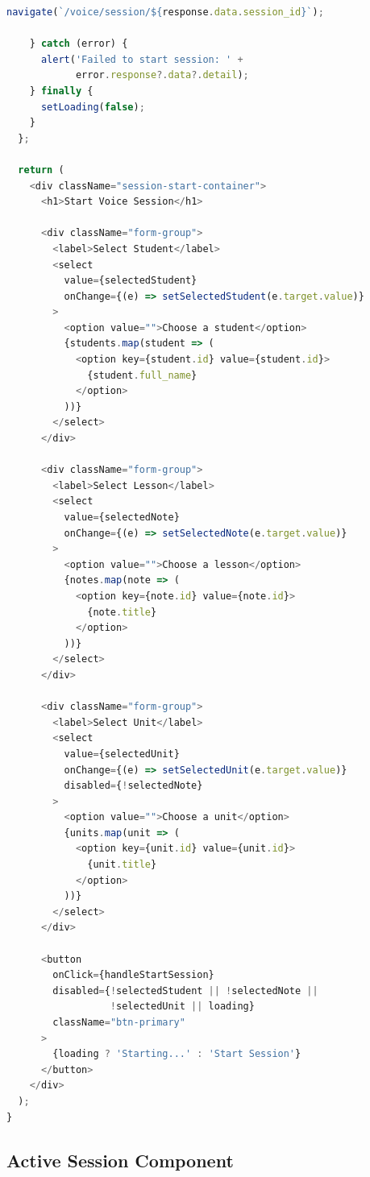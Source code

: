 \documentclass[12pt,a4paper,oneside]{article}
\begin{document}
\begin{lstlisting}[language=javascript]
      navigate(`/voice/session/${response.data.session_id}`);

    } catch (error) {
      alert('Failed to start session: ' + 
            error.response?.data?.detail);
    } finally {
      setLoading(false);
    }
  };

  return (
    <div className="session-start-container">
      <h1>Start Voice Session</h1>
      
      <div className="form-group">
        <label>Select Student</label>
        <select
          value={selectedStudent}
          onChange={(e) => setSelectedStudent(e.target.value)}
        >
          <option value="">Choose a student</option>
          {students.map(student => (
            <option key={student.id} value={student.id}>
              {student.full_name}
            </option>
          ))}
        </select>
      </div>

      <div className="form-group">
        <label>Select Lesson</label>
        <select
          value={selectedNote}
          onChange={(e) => setSelectedNote(e.target.value)}
        >
          <option value="">Choose a lesson</option>
          {notes.map(note => (
            <option key={note.id} value={note.id}>
              {note.title}
            </option>
          ))}
        </select>
      </div>

      <div className="form-group">
        <label>Select Unit</label>
        <select
          value={selectedUnit}
          onChange={(e) => setSelectedUnit(e.target.value)}
          disabled={!selectedNote}
        >
          <option value="">Choose a unit</option>
          {units.map(unit => (
            <option key={unit.id} value={unit.id}>
              {unit.title}
            </option>
          ))}
        </select>
      </div>

      <button
        onClick={handleStartSession}
        disabled={!selectedStudent || !selectedNote || 
                  !selectedUnit || loading}
        className="btn-primary"
      >
        {loading ? 'Starting...' : 'Start Session'}
      </button>
    </div>
  );
}
\end{lstlisting}

\subsection{Active Session Component}
\end{document}
